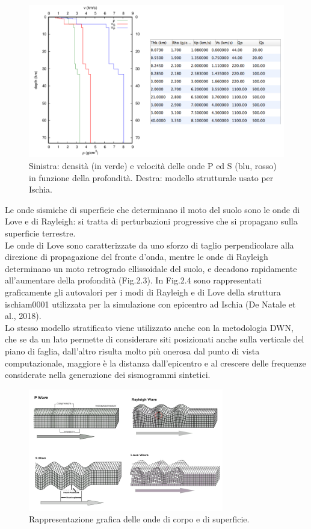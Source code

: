 \documentclass[a4paper,12pt,titlepage]{article}
\begin{document}
\begin{figure}[htbp]
 \centering
 \includegraphics[width=.5\linewidth]{Img/ModelloStrutturaleIschia.png}
 \caption{Sinistra: densità (in verde) e velocità delle onde P ed S (blu, rosso)
in funzione della profondità. Destra: modello strutturale usato per Ischia.}
 \label{fig:ModStrIsc}
\end{figure}

Le onde sismiche di superficie che determinano il moto del suolo sono le onde di Love e di Rayleigh: si tratta di perturbazioni progressive che si propagano sulla superficie terrestre.\\
Le onde di Love sono caratterizzate da uno sforzo di taglio perpendicolare alla direzione di propagazione del fronte d'onda, mentre le onde di Rayleigh determinano un moto retrogrado ellissoidale del suolo, e decadono rapidamente all'aumentare della profondità (Fig.2.3). In Fig.2.4 sono rappresentati graficamente gli autovalori per i modi di Rayleigh e di Love della struttura ischiam0001 utilizzata per la simulazione con epicentro ad Ischia (De Natale et al., 2018).\\
Lo stesso modello stratificato viene utilizzato anche con la metodologia DWN, che se da un lato permette di considerare siti posizionati anche sulla verticale del piano di faglia, dall'altro risulta molto più onerosa dal punto di vista computazionale, maggiore è la distanza dall'epicentro e al crescere delle frequenze considerate nella generazione dei sismogrammi sintetici.

\begin{figure}[htbp]
 \centering
 \includegraphics[width=.5\linewidth]{Img/PandSwaves.png}
 \caption{Rappresentazione grafica delle onde di corpo e di superficie.}
 \label{fig:PandSwaves}
\end{figure}
\end{document}

